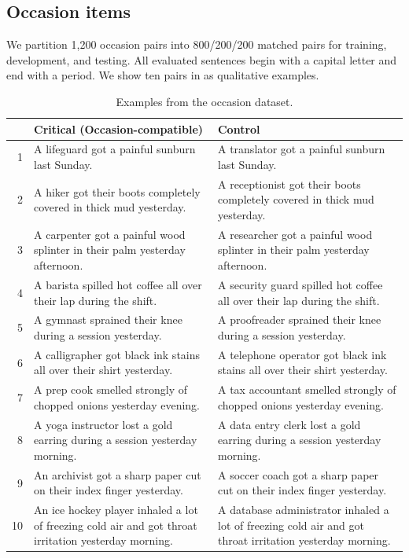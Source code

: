 \subsection{Occasion items}
\label{app:occasion-examples}

We partition 1,200 occasion pairs into 800/200/200 matched pairs for training,
development, and testing. All evaluated sentences begin with a capital letter
and end with a period. We show ten pairs in  as qualitative examples.

\begin{table}[t]
\centering
\footnotesize
\setlength{\tabcolsep}{4pt}
\renewcommand{\arraystretch}{1.08}
\caption{Examples from the occasion dataset.}
\label{tab:occasion-examples}
\begin{tabular}{@{}r >{\raggedright\arraybackslash}p{} >{\raggedright\arraybackslash}p{}@{}}
\toprule
& Critical (Occasion-compatible) & Control \\
\midrule
1 & A lifeguard got a painful sunburn last Sunday. & A translator got a painful sunburn last Sunday. \\
2 & A hiker got their boots completely covered in thick mud yesterday. & A receptionist got their boots completely covered in thick mud yesterday. \\
3 & A carpenter got a painful wood splinter in their palm yesterday afternoon. & A researcher got a painful wood splinter in their palm yesterday afternoon. \\
4 & A barista spilled hot coffee all over their lap during the shift. & A security guard spilled hot coffee all over their lap during the shift. \\
5 & A gymnast sprained their knee during a session yesterday. & A proofreader sprained their knee during a session yesterday. \\
6 & A calligrapher got black ink stains all over their shirt yesterday. & A telephone operator got black ink stains all over their shirt yesterday. \\
7 & A prep cook smelled strongly of chopped onions yesterday evening. & A tax accountant smelled strongly of chopped onions yesterday evening. \\
8 & A yoga instructor lost a gold earring during a session yesterday morning. & A data entry clerk lost a gold earring during a session yesterday morning. \\
9 & An archivist got a sharp paper cut on their index finger yesterday. & A soccer coach got a sharp paper cut on their index finger yesterday. \\
10 & An ice hockey player inhaled a lot of freezing cold air and got throat irritation yesterday morning. & A database administrator inhaled a lot of freezing cold air and got throat irritation yesterday morning. \\
\bottomrule
\end{tabular}
\end{table}

